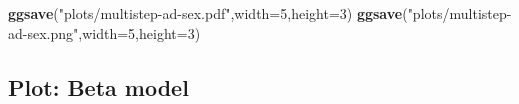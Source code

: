 \documentclass[
]{article}
\newenvironment{Shaded}{\begin{snugshade}}{\end{snugshade}}
\newcommand{\DataTypeTok}[1]{\textcolor[rgb]{0.13,0.29,0.53}{#1}}
\newcommand{\DecValTok}[1]{\textcolor[rgb]{0.00,0.00,0.81}{#1}}
\newcommand{\KeywordTok}[1]{\textcolor[rgb]{0.13,0.29,0.53}{\textbf{#1}}}
\newcommand{\NormalTok}[1]{#1}
\newcommand{\StringTok}[1]{\textcolor[rgb]{0.31,0.60,0.02}{#1}}
\begin{document}
\begin{Shaded}
\begin{Highlighting}[]
\KeywordTok{ggsave}\NormalTok{(}\StringTok{"plots/multistep-ad-sex.pdf"}\NormalTok{,}\DataTypeTok{width=}\DecValTok{5}\NormalTok{,}\DataTypeTok{height=}\DecValTok{3}\NormalTok{)}
\KeywordTok{ggsave}\NormalTok{(}\StringTok{"plots/multistep-ad-sex.png"}\NormalTok{,}\DataTypeTok{width=}\DecValTok{5}\NormalTok{,}\DataTypeTok{height=}\DecValTok{3}\NormalTok{)}
\end{Highlighting}
\end{Shaded}

\hypertarget{plot-beta-model}{%
\subsection{Plot: Beta model}\label{plot-beta-model}}
\end{document}
